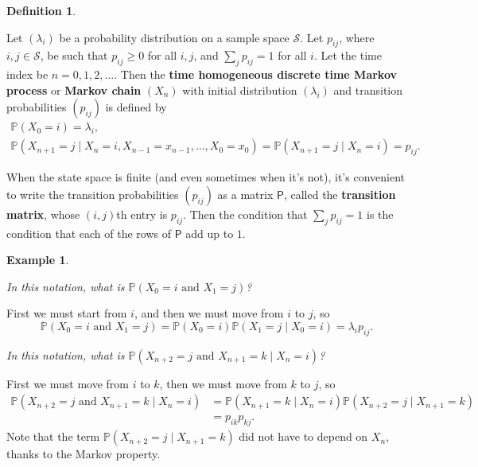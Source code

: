 \documentclass[
  a4paper,
]{article}
\theoremstyle{definition}
\newtheorem{definition}{Definition}[section]
\theoremstyle{definition}
\newtheorem{example}{Example}[section]
\theoremstyle{definition}
\theoremstyle{remark}
\begin{document}
\begin{definition}
\protect\hypertarget{def:def-thmc}{}\label{def:def-thmc}

Let \((\lambda_i)\) be a probability distribution on a sample space \(\mathcal S\). Let \(p_{ij}\), where \(i,j \in \mathcal S\), be such that \(p_{ij} \geq 0\) for all \(i,j\), and \(\sum_j p_{ij} = 1\) for all \(i\). Let the time index be \(n = 0,1,2,\dots\). Then the \textbf{time homogeneous discrete time Markov process} or \textbf{Markov chain} \((X_n)\) with initial distribution \((\lambda_i)\) and transition probabilities \((p_{ij})\) is defined by
\begin{gather*}
    \mathbb P(X_0 = i) = \lambda_i ,\\
    \mathbb P(X_{n+1} = j \mid X_n = i, X_{n-1} = x_{n-1}, \dots, X_0 = x_0) = \mathbb P(X_{n+1} = j \mid X_n = i) =  p_{ij}  . \end{gather*}

\end{definition}

When the state space is finite (and even sometimes when it's not), it's convenient to write the transition probabilities \((p_{ij})\) as a matrix \(\mathsf P\), called the \textbf{transition matrix}, whose \((i,j)\)th entry is \(p_{ij}\). Then the condition that \(\sum_j p_{ij} = 1\) is the condition that each of the rows of \(\mathsf P\) add up to \(1\).

\begin{example}
\protect\hypertarget{exm:mcex}{}\label{exm:mcex}

\emph{In this notation, what is \(\mathbb P(X_0 = i \text{ and } X_1 = j)\)?}

First we must start from \(i\), and then we must move from \(i\) to \(j\), so
\[ \mathbb P(X_0 = i \text{ and } X_1 = j) = \mathbb P(X_0 = i)\mathbb P(X_1 = j \mid X_0 = i) = \lambda_i p_{ij} . \]

\emph{In this notation, what is \(\mathbb P(X_{n+2} = j \text{ and } X_{n+1} = k \mid X_n = i)\)?}

First we must move from \(i\) to \(k\), then we must move from \(k\) to \(j\), so
\begin{align*}
\mathbb P(X_{n+2} = j \text{ and } X_{n+1} = k \mid X_n = i)
&= \mathbb P(X_{n+1} = k \mid X_n = i)\mathbb P(X_{n+2} = j \mid X_{n+1} = k) \\
&= p_{ik}p_{kj} .
\end{align*}
Note that the term \(\mathbb P(X_{n+2} = j \mid X_{n+1} = k)\) did not have to depend on \(X_n\), thanks to the Markov property.

\end{example}
\end{document}
